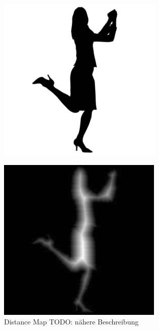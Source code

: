 \begin{figure}[h]
	\centering
	\begin{minipage}{4cm}
		\centering
		\includegraphics[width=1.0\linewidth]{./fig/person.jpg}
		\label{fig:beispiel_person}
	\end{minipage}
	\hspace{3cm}
	\begin{minipage}{4cm}
		\centering
		\includegraphics[width=1.0\linewidth]{./fig/distance_map_beispiel}	
	\end{minipage}
	\caption{Distance Map TODO: nähere Beschreibung}
	\label{fig:distance_map_beispiel}
\end{figure}
